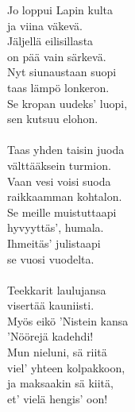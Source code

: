 
            Jo loppui Lapin kulta \\
            ja viina väkevä. \\
            Jäljellä eilisillasta \\
            on pää vain särkevä. \\
            Nyt siunaustaan suopi \\
            taas lämpö lonkeron. \\
            Se kropan uudeks' luopi, \\
            sen kutsuu elohon. \\
\hspace{10mm} \\
            Taas yhden taisin juoda \\
            välttääksein turmion. \\
            Vaan vesi voisi suoda \\
            raikkaamman kohtalon. \\
            Se meille muistuttaapi \\
            hyvyyttäs', humala. \\
            Ihmeitäs' julistaapi \\
            se vuosi vuodelta. \\
\hspace{10mm} \\
            Teekkarit laulujansa \\
            visertää kauniisti. \\
            Myös eikö 'Nistein kansa \\
            'Nöörejä kadehdi! \\
            Mun nieluni, sä riitä \\
            viel' yhteen kolpakkoon, \\
            ja maksaakin sä kiitä, \\
            et' vielä hengis' oon! \\
